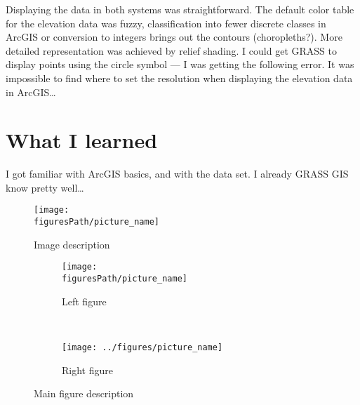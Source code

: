 \documentclass[10pt]{article}
\newcommand{\oneimgwidth}{0.7\textwidth}
\newcommand{\twoimgwidth}{0.45\textwidth}
\begin{document}
Displaying the data in both systems was straightforward. The default color table
for the elevation data was fuzzy, classification into fewer discrete classes
in ArcGIS or conversion to integers brings out the contours (choropleths?).
More detailed representation was achieved by relief shading.
I could get GRASS to display points using the circle symbol --- I was getting the following error.
It was impossible to find where to set the resolution when displaying the elevation data in ArcGIS\ldots


\section*{What I learned}

I got familiar with ArcGIS basics, and with the data set. I already GRASS GIS know pretty well\ldots



\newcommand{\figuresPath}{../figures}

\begin{figure}[htbp]
  \centering
  \texttt{[image: \\figuresPath/picture\_name]}
  \caption{Image description}
  \label{fig:figure-internal-label}
\end{figure}

\begin{figure}[htbp]
  \centering
  \begin{subfigure}[b]{\twoimgwidth}
    \texttt{[image: \\figuresPath/picture\_name]}
    \caption{Left figure}
  \end{subfigure}%
  ~ %
  \begin{subfigure}[b]{\twoimgwidth}
    \texttt{[image: ../figures/picture\_name]}
    \caption{Right figure}
  \end{subfigure}
  \caption{Main figure description}
  \label{fig:twotwo}
\end{figure}
\end{document}
